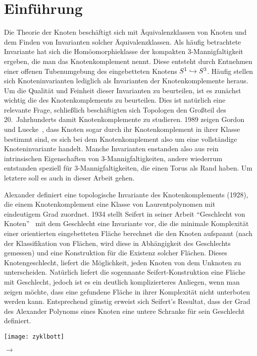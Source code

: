 \section{Einführung}
		
	\begin{minipage}[t][\textheight][t]{0.76\textwidth}

	Die Theorie der Knoten beschäftigt sich mit Äquivalenzklassen von Knoten und dem Finden von Invarianten solcher Äquivalenzklassen. Als häufig betrachtete Invariante hat sich die Homöomorphieklasse der kompakten 3-Mannigfaltigkeit ergeben, die man das Knotenkomplement nennt. Diese entsteht durch Entnehmen einer offenen Tubenumgebung des eingebetteten Knotens $S^1 \hookrightarrow S^3$. Häufig stellen sich Knoteninvarianten lediglich als Invarianten der Knotenkomplemente heraus. Um die Qualität und Feinheit dieser Invarianten zu beurteilen, ist es zunächst wichtig die des Knotenkomplements zu beurteilen. Dies ist natürlich eine relevante Frage, schließlich beschäftigten sich Topologen den Großteil des 20.~Jahrhunderts damit Knotenkomplemente zu studieren. 1989 zeigen Gordon und Luecke~\cite{Gordon.1989}, dass Knoten sogar durch ihr Knotenkomplement in ihrer Klasse bestimmt sind, es sich bei dem Knotenkomplement also um eine vollständige Knoteninvariante handelt. Manche Invarianten enstanden also aus rein intrinsischen Eigenschaften von 3-Mannigfaltigkeiten, andere wiederrum entstanden speziell für 3-Mannigfaltigkeiten, die einen Torus als Rand haben. Um letztere soll es auch in dieser Arbeit gehen.

	Alexander definiert eine topologische Invariante des Knotenkomplements \cite{Alexander.1928} (1928), die einem Knotenkomplement eine Klasse von Laurentpolynomen mit eindeutigem Grad zuordnet.  1934 stellt Seifert in seiner Arbeit "`Geschlecht von Knoten"'~\cite{Seifert.1934} mit dem Geschlecht eine Invariante vor, die die minimale Komplexität einer orientierten eingebetteten Fläche berechnet die den Knoten aufspannt (nach der Klassifikation von Flächen, wird diese in Abhängigkeit des Geschlechts gemessen) und eine Konstruktion für die Existenz solcher Flächen. Dieses Knotengeschlecht, liefert die Möglichkeit, jeden Knoten von dem Unknoten zu unterscheiden. Natürlich liefert die sogennante Seifert-Konstruktion eine Fläche mit Geschlecht, jedoch ist es ein deutlich komplizierteres Anliegen, wenn man zeigen möchte, dass eine gefundene Fläche in ihrer Komplexität nicht unterboten werden kann. Entsprechend günstig erweist sich Seifert's Resultat, dass der Grad des Alexander Polynoms eines Knoten eine untere Schranke für sein Geschlecht definiert.


	\vfill
	\begin{minipage}[t]{0.7\textwidth}
		\texttt{[image: zyklbott]} 
	\end{minipage}
	\begin{minipage}[t]{0.2\textwidth}
	\vspace{-1cm}
	\huge$\longrightarrow$
	\vfill
	\end{minipage}
	\vspace{1.5cm}
	\end{minipage}
